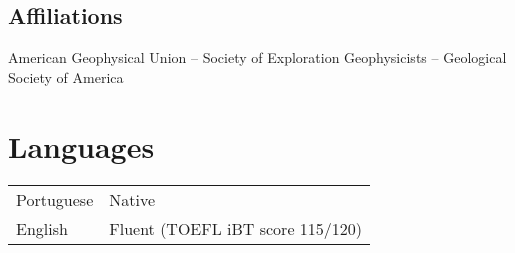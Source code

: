 \documentclass[11pt, a4paper]{article}
\newcommand{\TablePad}{\vspace{-0.4cm}}
\begin{document}
\subsection*{Affiliations}

American Geophysical Union
--
Society of Exploration Geophysicists
--
Geological Society of America


\section*{Languages}

\TablePad
\begin{tabularx}{\textwidth}{@{}p{} p{}@{}}
    Portuguese & Native
    \\
    English & Fluent (TOEFL iBT score 115/120)
\end{tabularx}
\end{document}
